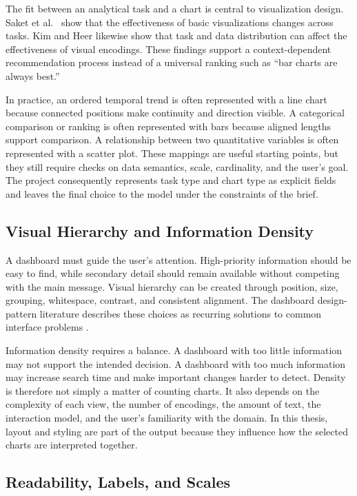 The fit between an analytical task and a chart is central to visualization design. Saket et al.~\cite{saket2019taskbased} show that the effectiveness of basic visualizations changes across tasks. Kim and Heer \cite{kim2018taskdata} likewise show that task and data distribution can affect the effectiveness of visual encodings. These findings support a context-dependent recommendation process instead of a universal ranking such as ``bar charts are always best.''

In practice, an ordered temporal trend is often represented with a line chart because connected positions make continuity and direction visible. A categorical comparison or ranking is often represented with bars because aligned lengths support comparison. A relationship between two quantitative variables is often represented with a scatter plot. These mappings are useful starting points, but they still require checks on data semantics, scale, cardinality, and the user's goal. The project consequently represents task type and chart type as explicit fields and leaves the final choice to the model under the constraints of the brief.

\subsection{Visual Hierarchy and Information Density}

A dashboard must guide the user's attention. High-priority information should be easy to find, while secondary detail should remain available without competing with the main message. Visual hierarchy can be created through position, size, grouping, whitespace, contrast, and consistent alignment. The dashboard design-pattern literature describes these choices as recurring solutions to common interface problems \cite{bach2023dashboardpatterns}.

Information density requires a balance. A dashboard with too little information may not support the intended decision. A dashboard with too much information may increase search time and make important changes harder to detect. Density is therefore not simply a matter of counting charts. It also depends on the complexity of each view, the number of encodings, the amount of text, the interaction model, and the user's familiarity with the domain. In this thesis, layout and styling are part of the output because they influence how the selected charts are interpreted together.

\subsection{Readability, Labels, and Scales}

